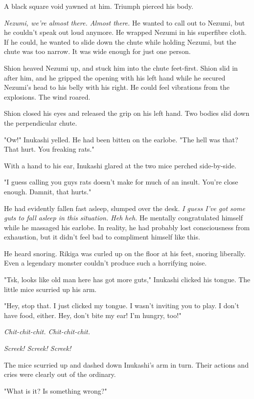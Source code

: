 A black square void yawned at him. Triumph pierced his body.

\emph{Nezumi, we're almost there. Almost there.} He wanted to call out to
Nezumi, but he couldn't speak out loud anymore. He wrapped Nezumi in his
superfibre cloth. If he could, he wanted to slide down the chute while
holding Nezumi, but the chute was too narrow. It was wide enough for
just one person.

Shion heaved Nezumi up, and stuck him into the chute feet-first. Shion
slid in after him, and he gripped the opening with his left hand while
he secured Nezumi's head to his belly with his right. He could feel
vibrations from the explosions. The wind roared.

Shion closed his eyes and released the grip on his left hand. Two bodies
slid down the perpendicular chute.

\mybreak

"Ow!" Inukashi yelled. He had been bitten on the earlobe. "The hell was
that? That hurt. You freaking rats."

With a hand to his ear, Inukashi glared at the two mice perched
side-by-side.

"I guess calling you guys rats doesn't make for much of an insult.
You're close enough. Damnit, that hurts."

He had evidently fallen fast asleep, slumped over the desk. \emph{I guess I've
	got some guts to fall asleep in this situation. Heh heh.} He mentally
congratulated himself while he massaged his earlobe. In reality, he had
probably lost consciousness from exhaustion, but it didn't feel bad to
compliment himself like this.

He heard snoring. Rikiga was curled up on the floor at his feet, snoring
liberally. Even a legendary monster couldn't produce such a horrifying
noise.

"Tsk, looks like old man here has got more guts," Inukashi clicked his
tongue. The little mice scurried up his arm.

"Hey, stop that. I just clicked my tongue. I wasn't inviting you to
play. I don't have food, either. Hey, don't bite my ear! I'm hungry,
too!"

\emph{Chit-chit-chit. Chit-chit-chit.}

\emph{Screek! Screek! Screek!}

The mice scurried up and dashed down Inukashi's arm in turn. Their
actions and cries were clearly out of the ordinary.

"What is it? Is something wrong?"

